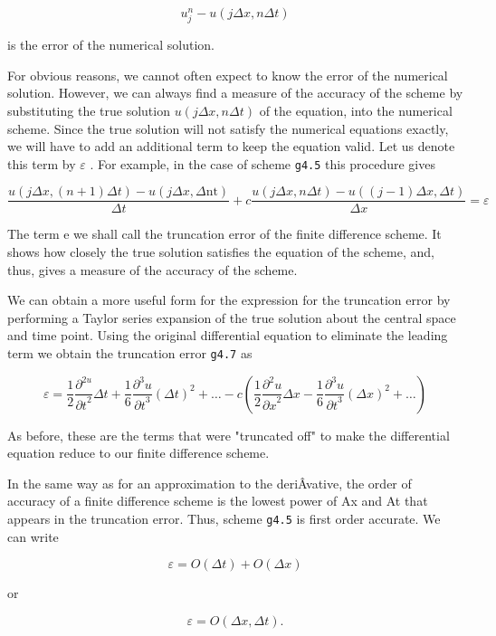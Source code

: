 {\[u_{j}^{n}-u ( j\Delta x,n\Delta t )\]}

is the error of the numerical solution.

For obvious reasons, we cannot often expect to know the error of the
numerical solution. However, we can always find a measure of the
accuracy of the scheme by substituting the true solution
\(u \left( j\Delta x,n\Delta t \right)\) of the equation, into the
numerical scheme. Since the true solution will not satisfy the numerical
equations exactly, we will have to add an additional term to keep the
equation valid. Let us denote this term by \(\varepsilon\) . For
example, in the case of scheme \texttt{g4.5} this procedure gives

{\[\frac{u\left( j\Delta x,( n + 1 )\Delta t \right)
- u\left( j\Delta x,\Delta\text{nt} \right)}{\Delta t} 
+ c\frac{u\left( j\Delta x,n\Delta t \right) 
- u\left( \left( j - 1 \right)\Delta x,\Delta t \right)}{\Delta x} = \varepsilon\]}

The term e we shall call the truncation error of the finite difference
scheme. It shows how closely the true solution satisfies the equation of
the scheme, and, thus, gives a measure of the accuracy of the scheme.

We can obtain a more useful form for the expression for the truncation
error by performing a Taylor series expansion of the true solution about
the central space and time point. Using the original differential
equation to eliminate the leading term we obtain the truncation error
\texttt{g4.7} as

{\[\varepsilon = \frac{1}{2}\frac{\partial^{2u}}{{\partial t}^{2}}\Delta t 
+ \frac{1}{6}\frac{\partial^{3}u}{{\partial t}^{3}}\left( \Delta t \right)^{2} +\ldots-
c(\frac{1}{2}\frac{\partial^{2}u}{{\partial x}^{2}}\Delta x -
\frac{1}{6}\frac{\partial^{3}u}{{\partial t}^{3}}\left( \Delta x \right)^{2}
+\ldots )\]}

As before, these are the terms that were "truncated off" to make the
differential equation reduce to our finite difference scheme.

In the same way as for an approximation to the deriÂ­vative, the order of
accuracy of a finite difference scheme is the lowest power of Ax and At
that appears in the truncation error. Thus, scheme \texttt{g4.5} is
first order accurate. We can write

\[\varepsilon = O \left( \Delta t \right) + O\left( \Delta x \right)\]

or

\[\varepsilon = O \left( \Delta x,\Delta t \right).\]

